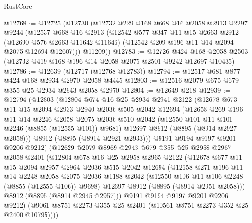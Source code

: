 \begin{lexlean}{RustCore}
\begin{coremodule}
@12768 := @12725
    (@12730
      (@12732
        @229
        @168
        @668
        @16
        @2058
        @2913
        @2297
        @9244
        (@12537
          @668
          @16
          @2913
          (@12542
            @577
            @347
            @11
            @15
            @2663
            @2912
            (@12690 @576 @2663 @11642 @11646)
            (@12542 @209 @196 @11 @14 @2094 @2075 @12694 @12607)))
        @11209))
@12783 := @12726
    @424
    @168
    @2058
    @2503
    (@12732 @419 @168 @196 @14 @2058 @2075 @2501 @9242 @12697 @10435)
@12786 := @12639 (@12717 (@12768 @12783))
@12794 := @12517 @681 @877 @424 @168 @2934 @2970 @2058 @4445
@12803 := @12516 @2079 @675 @679 @355 @25 @2934 @2943 @2058 @2970
@12804 := @12649 @218
@12939 := @12794
    (@12803
      (@12804
        @674
        @16
        @25
        @2934
        @2941
        @2122
        (@12678
          @673
          @11
          @15
          @2094
          @2933
          @2940
          @2036
          @505
          @2042
          @12694
          (@12658
            @269
            @196
            @11
            @14
            @2246
            @2058
            @2075
            @2036
            @510
            @2042
            (@12550 @101 @11 @101 @2246 (@8855 (@12555 @101)) @9681)
            @12697
            @8912
            (@8895 (@8914 @2927 @2058)))
          @8912
          (@8895 (@8914 @2921 @2933)))
        @9191
        @9194
        @9197
        @9201
        @9206
        @9212)
      (@12629
        @2079
        @8969
        @2943
        @679
        @355
        @25
        @2958
        @2967
        @2058
        @2401
        (@12804
          @678
          @16
          @25
          @2958
          @2965
          @2122
          (@12678
            @677
            @11
            @15
            @2094
            @2957
            @2964
            @2036
            @515
            @2042
            @12694
            (@12658
              @271
              @196
              @11
              @14
              @2248
              @2058
              @2075
              @2036
              @1188
              @2042
              (@12550 @106 @11 @106 @2248 (@8855 (@12555 @106)) @9698)
              @12697
              @8912
              (@8895 (@8914 @2951 @2058)))
            @8912
            (@8895 (@8914 @2945 @2957)))
          @9191
          @9194
          @9197
          @9201
          @9206
          @9212)
        (@9061 @8751 @2273 @355 @25 @2401 (@10561 @8751 @2273 @352 @25 @2400 @10795))))

\end{coremodule}
\end{lexlean}
